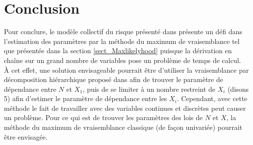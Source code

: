 \documentclass{article}
\begin{document}
	\section{Conclusion}
	Pour conclure, le modèle collectif du risque présenté dans \cite{Itre5} présente un défi dans l'estimation des paramètres par la méthode du maximum de vraisemblance tel que présentée dans la section \ref{sect_Maxlikelyhood} puisque la dérivation en chaîne sur un grand nombre de variables pose un problème de temps de calcul.\\
	
	 À cet effet, une solution envisageable pourrait être d'utiliser la vraisemblance par décomposition hiérarchique proposé dans \cite{LikelyhoodEstimation} afin de trouver le paramètre de dépendance entre $N$ et $X_1$, puis de se limiter à un nombre restreint de $X_i$ (disons 5) afin d'estimer le paramètre de dépendance entre les $X_i$. Cependant, avec cette méthode le fait de travailler avec des variables continues et discrètes peut causer un problème. Pour ce qui est de trouver les paramètres des lois de $N$ et $X$, la méthode du maximum de vraisemblance classique (de façon univariée) pourrait être envisagée.
 
	
	\clearpage
	
	
\end{document}
